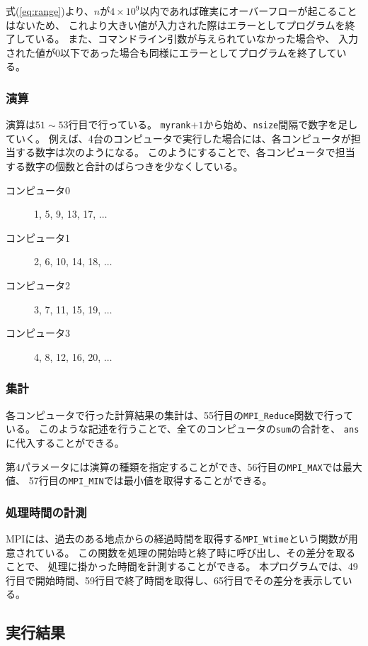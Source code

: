\documentclass[a4j,titlepage]{jsarticle}
\begin{document}
式(\ref{eq:range})より、$n$が$4 \times 10^9$以内であれば確実にオーバーフローが起こることはないため、
これより大きい値が入力された際はエラーとしてプログラムを終了している。
また、コマンドライン引数が与えられていなかった場合や、
入力された値が0以下であった場合も同様にエラーとしてプログラムを終了している。

\subsubsection{演算}
演算は$51 \sim 53$行目で行っている。
\texttt{myrank}$+1$から始め、\texttt{nsize}間隔で数字を足していく。
例えば、4台のコンピュータで実行した場合には、各コンピュータが担当する数字は次のようになる。
このようにすることで、各コンピュータで担当する数字の個数と合計のばらつきを少なくしている。

\begin{description}
  \item[コンピュータ0] 1, 5, 9,  13, 17, $\dots$
  \item[コンピュータ1] 2, 6, 10, 14, 18, $\dots$
  \item[コンピュータ2] 3, 7, 11, 15, 19, $\dots$
  \item[コンピュータ3] 4, 8, 12, 16, 20, $\dots$
\end{description}

\subsubsection{集計}
各コンピュータで行った計算結果の集計は、55行目の\texttt{MPI\_Reduce}関数で行っている。
このような記述を行うことで、全てのコンピュータの\texttt{sum}の合計を、
\texttt{ans}に代入することができる。

第4パラメータには演算の種類を指定することができ、56行目の\texttt{MPI\_MAX}では最大値、
57行目の\texttt{MPI\_MIN}では最小値を取得することができる。

\subsubsection{処理時間の計測}
MPIには、過去のある地点からの経過時間を取得する\texttt{MPI\_Wtime}という関数が用意されている。
この関数を処理の開始時と終了時に呼び出し、その差分を取ることで、
処理に掛かった時間を計測することができる。
本プログラムでは、49行目で開始時間、59行目で終了時間を取得し、65行目でその差分を表示している。

\subsection{実行結果}
\end{document}
